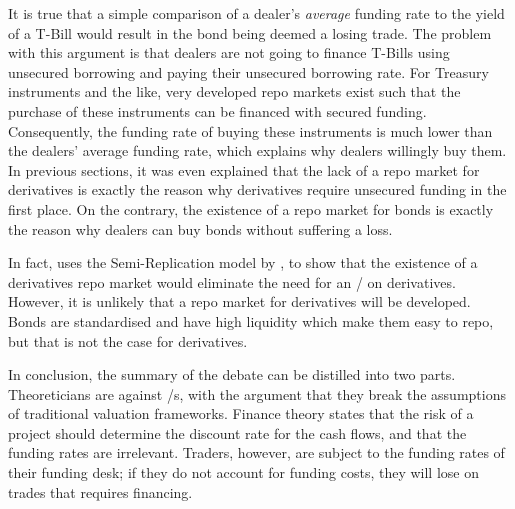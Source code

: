 \documentclass[main.tex]{subfiles}
\begin{document}
            It is true that a simple comparison of a dealer's \textit{average} funding rate
            to the yield of a T-Bill would result in the bond being deemed a losing trade.
            The problem with this argument is that dealers are not going to finance T-Bills
            using unsecured borrowing and paying their unsecured borrowing rate.
            For Treasury instruments and the like,
            very developed repo markets exist such that 
            the purchase of these instruments can be financed with secured funding.
            Consequently, the funding rate of buying these instruments is much lower 
            than the dealers' average funding rate,
            which explains why dealers willingly buy them.
            In previous sections, it was even explained that
            the lack of a repo market for derivatives is exactly the reason 
            why derivatives require unsecured funding in the first place.
            On the contrary, the existence of a repo market for bonds is exactly the reason
            why dealers can buy bonds without suffering a loss.

            In fact, \textcite{Green2015XVA}
            uses the Semi-Replication model by \textcite{BurgardKjaer2013Funding},
            to show that the existence of a derivatives repo market
            would eliminate the need for an \FVA/ on derivatives. 
            However, it is unlikely that a repo market for derivatives will be developed.
            Bonds are standardised and have high liquidity which make them easy to repo,
            but that is not the case for derivatives.

        In conclusion, the summary of the debate can be distilled into two parts.
        Theoreticians are against \FVA/s, 
        with the argument that they break the assumptions of traditional valuation frameworks.
        Finance theory states that the risk of a project 
        should determine the discount rate for the cash flows, 
        and that the funding rates are irrelevant.
        Traders, however, are subject to the funding rates of their funding desk;
        if they do not account for funding costs, they will lose on trades that requires financing.
\end{document}
